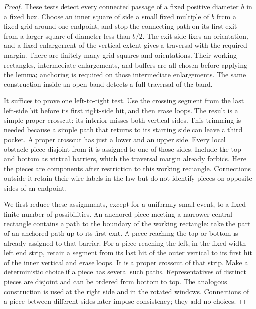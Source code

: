 \begin{proof}
These tests detect every connected passage of a fixed positive
diameter $b$ in a fixed box. Choose an inner square of side a small
fixed multiple of $b$ from a fixed grid around one endpoint, and
stop the connecting path on its first exit from a larger square
of diameter less than $b/2$. The exit side fixes an orientation, and
a fixed enlargement of the vertical extent gives a traversal with
the required margin. There are finitely many grid squares and
orientations. Their working rectangles, intermediate enlargements,
and buffers are all chosen before applying the lemma; anchoring is
required on those intermediate enlargements. The same construction
inside an open band detects a full traversal of the band.

It suffices to prove one left-to-right test. Use the crossing segment
from the last left-side hit before its first right-side hit, and then
erase loops. The result is a simple proper crosscut: its interior
misses both vertical sides.
This trimming is needed because a simple path that returns to its
starting side can leave a third pocket. A proper crosscut has just a
lower and an upper side. Every local obstacle piece disjoint from it is
assigned to one of those sides. Include the top and bottom as virtual
barriers, which the traversal margin already forbids.
Here the pieces are components after restriction to this working
rectangle. Connections outside it retain their wire labels in the
law but do not identify pieces on opposite sides of an endpoint.

We first reduce these assignments, except for a uniformly small event,
to a fixed finite number of possibilities. An anchored piece meeting
a narrower central rectangle contains a path to the boundary of the
working rectangle: take the part of an anchored path up to its first
exit. A piece reaching the top or bottom is already assigned to that
barrier. For a piece reaching the left, in the fixed-width left end strip,
retain a segment from its last hit of the outer vertical to its first
hit of the inner vertical and erase loops. It is a proper crosscut of
that strip. Make a deterministic choice if a piece has
several such paths. Representatives of distinct pieces are disjoint
and can be ordered from bottom to top. The analogous construction is
used at the right side and in the rotated windows. Connections of a
piece between different
sides later impose consistency; they add no choices.


\end{proof}
